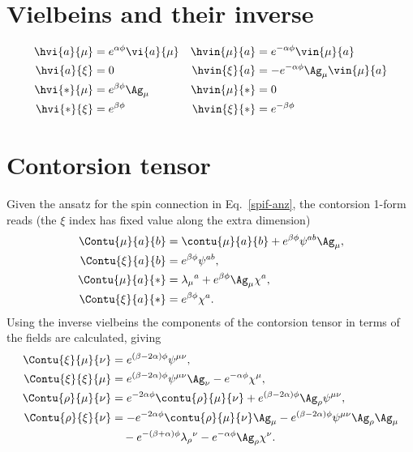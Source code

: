 \documentclass[aps,prd,12pt,superscriptaddress,showpacs,showkeys,reprint]{revtex4-1}
\begin{document}
\appendix

\section{Vielbeins and their inverse}

\begin{align*}
  \hvi{a}{\mu} &= e^{\alpha \phi} \vi{a}{\mu} & \hvin{\mu}{a} &=  e^{- \alpha \phi} \vin{\mu}{a} \\
  \hvi{a}{\xi} &= 0 & \hvin{\xi}{a} &= - e^{ - \alpha \phi} \Ag_\mu \vin{\mu}{a} \\
  \hvi{*}{\mu} &= e^{\beta \phi} \Ag_\mu & \hvin{\mu}{*} &= 0 \\
  \hvi{*}{\xi} &= e^{\beta \phi} & \hvin{\xi}{*} &= e^{- \beta \phi}
\end{align*}

\section{Contorsion tensor}

Given the ansatz for the spin connection in Eq.~\eqref{spif-anz}, the contorsion 1-form reads (the $\xi$ index has fixed value along the extra dimension)
\begin{align}
  \Contu{\mu}{a}{b} &= \contu{\mu}{a}{b} + e^{\beta \phi} \psi^{ab} \Ag_\mu, \\
  \Contu{\xi}{a}{b} &= e^{\beta \phi} \psi^{ab}, \\
  \Contu{\mu}{a}{*} &= \lambda_\mu{}^a + e^{\beta \phi} \Ag_\mu \chi^a, \\
  \Contu{\xi}{a}{*} &= e^{\beta \phi} \chi^{a}.
\end{align}
Using the inverse vielbeins the components of the contorsion tensor in terms of the fields are calculated, giving
\begin{align}
  \Contu{\xi}{\mu}{\nu} &= e^{(\beta - 2\alpha)\phi} \psi^{\mu\nu}, \\
  \Contu{\xi}{\xi}{\mu} &= e^{(\beta - 2\alpha)\phi} \psi^{\mu\nu} \Ag_\nu - e^{-\alpha \phi} \chi^\mu, \\
  \Contu{\rho}{\mu}{\nu} &= e^{ - 2\alpha \phi} \contu{\rho}{\mu}{\nu} + e^{(\beta - 2\alpha)\phi} \Ag_\rho \psi^{\mu\nu}, \\
    \Contu{\rho}{\xi}{\nu} &= - e^{ - 2\alpha \phi} \contu{\rho}{\mu}{\nu} \Ag_\mu - e^{(\beta - 2\alpha)\phi} \psi^{\mu\nu} \Ag_\rho \Ag_\mu \\
    & \quad - e^{ - (\beta +\alpha) \phi} \lambda_\rho{}^\nu - e^{ - \alpha \phi} \Ag_\rho \chi^\nu. \notag
\end{align}
\end{document}
